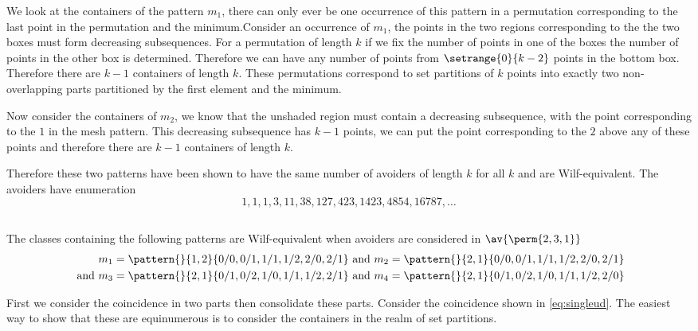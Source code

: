We look at the containers of the pattern \(m_1\), there can only ever
be one occurrence of this pattern in a permutation corresponding to
the last point in the permutation and the minimum.Consider an occurrence of \(m_1\),
the points in the two regions corresponding to the the two boxes must form decreasing
subsequences.
For a permutation of length \(k\) if we fix the number of points in
one of the boxes the number of points in the other box is determined.
Therefore we can have any number of points from \(\setrange{0}{k-2}\)
points in the bottom box. Therefore there are \(k-1\) containers of
length \(k\). These permutations correspond to set partitions of \(k\)
points into exactly two non-overlapping parts partitioned by the first
element and the minimum.

Now consider the containers of \(m_2\), we know that the unshaded region
must contain a decreasing subsequence, with the point corresponding to
the \(1\) in the mesh pattern. This decreasing subsequence has \(k-1\)
points, we can put the point corresponding to the \(2\) above any of these
points and therefore there are \(k-1\) containers of length \(k\).

Therefore these two patterns have been shown to have the same number of
avoiders of length \(k\) for all \(k\) and are Wilf-equivalent.
The avoiders have enumeration
\begin{equation*}
    1, 1, 1, 3, 11, 38, 127, 423, 1423, 4854, 16787,\dotsc
\end{equation*}

\subsection{}
\nextvar
The classes containing the following patterns are Wilf-equivalent
when avoiders are considered in \(\av{\perm{2,3,1}}\)
\begin{align}
    m_1 = \pattern{}{1,2}{0/0,0/1,1/1,1/2,2/0,2/1} &\text{ and }
    m_2 = \pattern{}{2,1}{0/0,0/1,1/1,1/2,2/0,2/1} \label{eq:singleud}\\
    \text{ and }
    m_3 = \pattern{}{2,1}{0/1,0/2,1/0,1/1,1/2,2/1} &\text{ and }
    m_4 = \pattern{}{2,1}{0/1,0/2,1/0,1/1,1/2,2/0} \label{eq:other}
\end{align}

First we consider the coincidence in two parts then consolidate these parts.
Consider the coincidence shown in \eqref{eq:singleud}. The easiest way to
show that these are equinumerous is to consider the containers in the realm
of set partitions.

